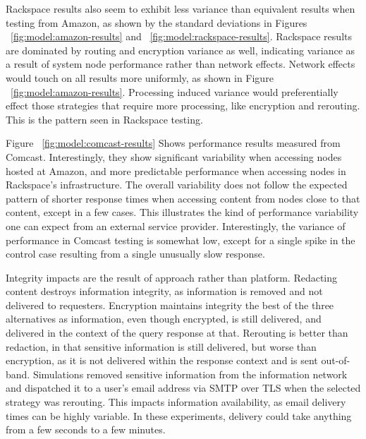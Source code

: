 Rackspace results also seem to exhibit less variance than equivalent results when testing from Amazon, as shown by the standard deviations in Figures ~\ref{fig:model:amazon-results} and ~\ref{fig:model:rackspace-results}.  Rackspace results are dominated by routing and encryption variance as well, indicating variance as a result of system node performance rather than network effects.  Network effects would touch on all results more uniformly, as shown in Figure ~\ref{fig:model:amazon-results}.  Processing induced variance would preferentially effect those strategies that require more processing, like encryption and rerouting.  This is the pattern seen in Rackspace testing.

Figure ~\ref{fig:model:comcast-results} Shows performance results measured from Comcast.  Interestingly, they show significant variability when accessing nodes hosted at Amazon, and more predictable performance when accessing nodes in Rackspace's infrastructure.  The overall variability does not follow the expected pattern of shorter response times when accessing content from nodes close to that content, except in a few cases.  This illustrates the kind of performance variability one can expect from an external service provider.  Interestingly, the variance of performance in Comcast testing is somewhat low, except for a single spike in the control case resulting from a single unusually slow response.

Integrity impacts are the result of approach rather than platform.  Redacting content destroys information integrity, as information is removed and not delivered to requesters.  Encryption maintains integrity the best of the three alternatives as information, even though encrypted, is still delivered, and delivered in the context of the query response at that.  Rerouting is better than redaction, in that sensitive information is still delivered, but worse than encryption, as it is not delivered within the response context and is sent out-of-band. Simulations removed sensitive information from the information network and dispatched it to a user's email address via SMTP over TLS when the selected strategy was rerouting.  This impacts information availability, as email delivery times can be highly variable.  In these experiments, delivery could take anything from a few seconds to a few minutes.


